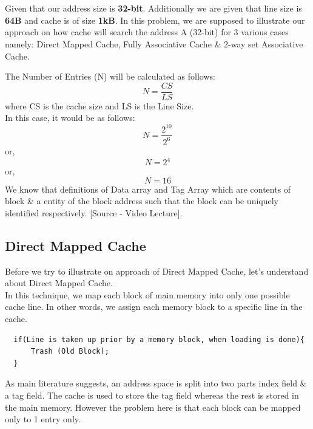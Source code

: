 \documentclass[12pt]{article}
\begin{document}
\maketitle

\section{}
Given that our address size is \textbf{32-bit}. Additionally we are given that line size is \textbf{64B} and cache is of size \textbf{1kB}. In this problem, we are supposed to illustrate our approach on how cache will search the address A (32-bit) for 3 various cases namely: Direct Mapped Cache, Fully Associative Cache \& 2-way set Associative Cache.

The Number of Entries (N) will be calculated as follows:
\begin{equation*}
    N = \frac{CS}{LS}
\end{equation*}
where CS is the cache size and LS is the Line Size. \\

In this case, it would be as follows:
\begin{equation*}
    N = \frac{2^{10}}{2^6}
\end{equation*}
or,
\begin{equation*}
    N = 2^4
\end{equation*}
or,
\begin{equation*}
    N = 16
\end{equation*}
We know that definitions of Data array and Tag Array which are contents of block \& a entity of the block address such that the block can be uniquely identified respectively. [Source - Video Lecture].
\subsection{Direct Mapped Cache}
Before we try to illustrate on approach of Direct Mapped Cache, let's understand about Direct Mapped Cache. \\

In this technique, we map each block of main memory into only one possible cache line. In other words, we assign each memory block to a specific line in the cache.
\begin{verbatim}
  if(Line is taken up prior by a memory block, when loading is done){
      Trash (Old Block);
  }  
\end{verbatim}
As main literature suggests, an address space is split into two parts index field \& a tag field. The cache is used to store the tag field whereas the rest is stored in the main memory. However the problem here is that each block can be mapped only to 1 entry only. \\
\end{document}
